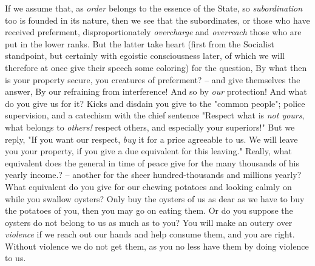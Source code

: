 \documentclass[a4paper]{book}
\begin{document}
If we assume that, as \textit{order} belongs to the essence of the State, so 
\textit{subordination} too is founded in its nature, then we see that the 
subordinates, or those who have received preferment, disproportionately 
\textit{overcharge} and \textit{overreach} those who are put in the lower 
ranks. But the latter take heart (first from the Socialist standpoint, but 
certainly with egoistic consciousness later, of which we will therefore at 
once give their speech some coloring) for the question, By what then is your 
property secure, you creatures of preferment? -- and give themselves the 
answer, By our refraining from interference! And so by \textit{our} 
protection! And what do you give us for it? Kicks and disdain you give to the 
"{}common people"{}; police supervision, and a catechism with the chief 
sentence "{}Respect what is \textit{not yours}, what belongs to 
\textit{others!} respect others, and especially your superiors!"{} But we 
reply, "{}If you want our respect, \textit{buy} it for a price agreeable to 
us. We will leave you your property, if you give a due equivalent for this 
leaving."{} Really, what equivalent does the general in time of peace give for 
the many thousands of his yearly income.? -- another for the sheer 
hundred-thousands and millions yearly? What equivalent do you give for our 
chewing potatoes and looking calmly on while you swallow oysters? Only buy the 
oysters of us as dear as we have to buy the potatoes of you, then you may go 
on eating them. Or do you suppose the oysters do not belong to us as much as 
to you? You will make an outcry over \textit{violence} if we reach out our 
hands and help consume them, and you are right. Without violence we do not get 
them, as you no less have them by doing violence to us.
\end{document}

